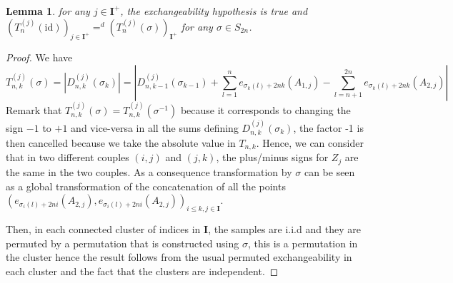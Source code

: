 \documentclass{article}
\theoremstyle{plain}
\newtheorem{Lemma}{Lemma}
\theoremstyle{remark}
\newcommand{\1}{\mathbbm{1}}
\newcommand{\id}{\mathrm{id}}
\numberwithin{equation}{section}
\begin{document}
\begin{Lemma}
for any $j \in \textbf{I}^+$, the exchangeability hypothesis is true and $(T_n^{(j)}(\id))_{j \in\textbf{I}^+} =^d (T_n^{(j)}(\sigma))_{\textbf{I}^+}$ for any $\sigma \in S_{2n}$.

\end{Lemma}
\begin{proof}
We have
$$T_{n,k}^{(j)}(\sigma)=|D_{n,k}^{(j)}(\sigma_{k})|= \left|D_{n,k-1}^{(j)}(\sigma_{k-1})+\sum_{l=1}^{n} e_{\sigma_k(l)+2nk}(A_{1,j})-\sum_{l=n+1}^{2n} e_{\sigma_k(l)+2nk}(A_{2,j}) \right| $$
Remark that $T_{n,k}^{(j)}(\sigma) = T_{n,k}^{(j)}(\sigma^{-1})$ because it corresponds to changing the sign $-1$
 to $+1$ and vice-versa in all the sums defining $D_{n,k}^{(j)}(\sigma_{k})$, the factor -1 is then cancelled because we take the absolute value in $T_{n,k}$. Hence, we can consider that in two different couples $(i,j)$ and $(j,k)$, the plus/minus signs for $Z_j$ are the same in the two couples. As a consequence transformation by $\sigma$ can be seen as a global transformation of the concatenation of all the points $(e_{\sigma_i(l)+2ni}(A_{2,j}), e_{\sigma_i(l)+2ni}(A_{2,j}))_{i\le k,j\in \textbf{I}}$. 

Then, in each connected cluster of indices in $\textbf{I}$, the samples are i.i.d and they are permuted by a permutation that is constructed using $\sigma$, this is a permutation in the cluster hence the result follows from the usual permuted exchangeability in each cluster and the fact that the clusters are independent.
\end{proof}
\end{document}
